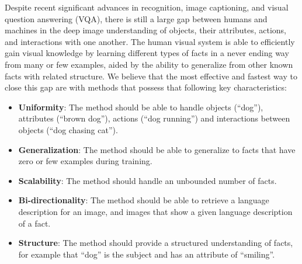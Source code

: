 \documentclass[runningheads]{llncs}
\begin{document}
Despite recent significant advances in recognition, image captioning, and visual question answering (VQA), there is still a large gap between humans and machines in the deep image understanding of objects, their attributes, actions, and interactions with one another. The human visual system is able to efficiently gain visual knowledge by learning different types of facts in a never ending way from many or few examples, aided by the ability to generalize from other known facts with related structure. We believe that the most effective and fastest way to close this gap are with methods that possess that following key characteristics:
\begin{itemize}
	\item \textbf{Uniformity}:  The method should be able to handle objects (``dog''), attributes (``brown dog''), actions (``dog running'') and interactions between objects (``dog chasing cat'').
	\item \textbf{Generalization}:  The method should be able to generalize to facts 
that have zero or few examples during training.
	\item \textbf{Scalability}:  The method should handle an unbounded number of facts.
	\item \textbf{Bi-directionality}:  The method should be able to retrieve a language description for an image, and images that show a given language description of a fact.
	\item \textbf{Structure}:  The method should provide a structured understanding of facts, for example that ``dog'' is the subject and has an attribute of ``smiling''. %
\end{itemize}%
\end{document}
